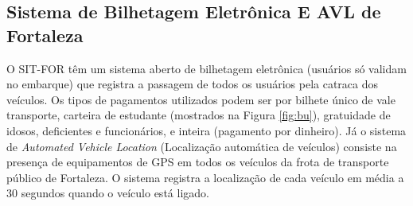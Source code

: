 \documentclass[        
    a4paper,          %
    12pt,             %
    chapter=TITLE,    %
    section=Title,    %
    subsection=Title, %
    oneside,          %
    english,          %
    spanish,          %
    brazil,           %
    fleqn             %
]{abntex2}
\begin{document}
  \begin{figure}[!h]
  \captionsetup{width=16cm}
  \centering
  \end{figure}
  
  \hypertarget{sistema-de-bilhetagem-eletronica-e-avl-de-fortaleza}{%
  \subsection{Sistema de Bilhetagem Eletrônica E AVL de Fortaleza}\label{sistema-de-bilhetagem-eletronica-e-avl-de-fortaleza}}
  
  O SIT-FOR têm um sistema aberto de bilhetagem eletrônica (usuários só validam no embarque) que registra a passagem de todos os usuários pela catraca dos veículos. Os tipos de pagamentos utilizados podem ser por bilhete único de vale transporte, carteira de estudante (mostrados na Figura \ref{fig:bu}), gratuidade de idosos, deficientes e funcionários, e inteira (pagamento por dinheiro). Já o sistema de \emph{Automated Vehicle Location} (Localização automática de veículos) consiste na presença de equipamentos de GPS em todos os veículos da frota de transporte público de Fortaleza. O sistema registra a localização de cada veículo em média a 30 segundos quando o veículo está ligado.
  
  \begin{figure}[!h]
  \captionsetup{width=16cm}
  \centering
  \end{figure}
  
\end{document}

